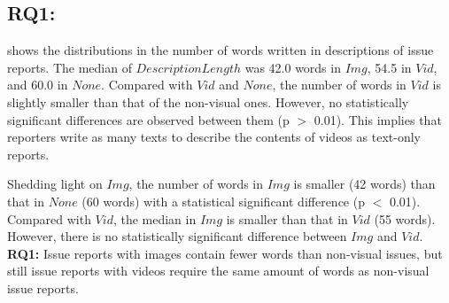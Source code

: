 % 



\subsection*{RQ1: \RQone{}}

 shows the distributions in the number of words written in descriptions of issue reports. The median of $DescriptionLength$ was 42.0 words in $Img$, 54.5 in $Vid$, and 60.0 in $None$. 
Compared with $Vid$ and $None$, the number of words in $Vid$ is slightly smaller than that of the non-visual ones. However, no statistically significant differences are observed between them (p $>$ 0.01). This implies that reporters write as many texts to describe the contents of videos as text-only reports. 

Shedding light on $Img$, the number of words in $Img$ is smaller (42 words) than 
that in $None$ (60 words) with a statistical significant difference (p $<$ 0.01). 
Compared with $Vid$, the median in $Img$ is smaller than that in $Vid$ (55 words). 
However, there is no statistically significant difference between $Img$ and $Vid$.%
\vspace{-0.2cm}%
\summarybox
{
{\bf RQ1: }{Issue reports with images contain fewer words than non-visual issues, but still issue reports with videos require the same amount of words as non-visual issue reports. 
}}

